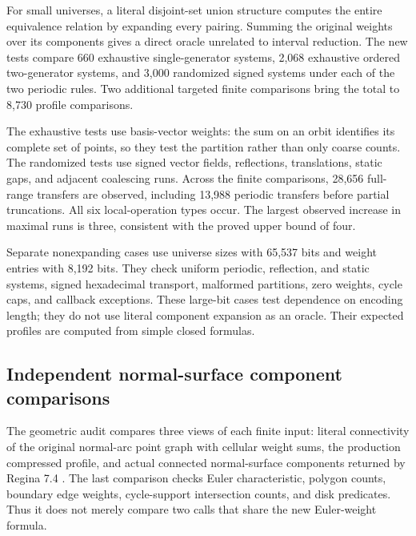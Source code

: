 For small universes, a literal disjoint-set union structure computes the
entire equivalence relation by expanding every pairing.  Summing the original
weights over its components gives a direct oracle unrelated to interval
reduction.  The new tests compare 660 exhaustive single-generator systems,
2,068 exhaustive ordered two-generator systems, and 3,000 randomized signed
systems under each of the two periodic rules.  Two additional targeted
finite comparisons bring the total to 8,730 profile comparisons.

The exhaustive tests use basis-vector weights: the sum on an orbit identifies
its complete set of points, so they test the partition rather than only
coarse counts.  The randomized tests use signed vector fields, reflections,
translations, static gaps, and adjacent coalescing runs.  Across the finite
comparisons, 28,656 full-range transfers are observed, including 13,988
periodic transfers before partial truncations.  All six local-operation
types occur.  The largest observed increase in maximal runs is three,
consistent with the proved upper bound of four.

Separate nonexpanding cases use universe sizes with 65,537 bits and weight
entries with 8,192 bits.  They check uniform periodic, reflection, and static
systems, signed hexadecimal transport, malformed partitions, zero weights,
cycle caps, and callback exceptions.  These large-bit cases test dependence
on encoding length; they do not use literal component expansion as an oracle.
Their expected profiles are computed from simple closed formulas.

\subsection{Independent normal-surface component comparisons}

The geometric audit compares three views of each finite input: literal
connectivity of the original normal-arc point graph with cellular weight
sums, the production compressed profile, and actual connected normal-surface
components returned by Regina 7.4 \cite{Regina}.  The last comparison checks
Euler characteristic, polygon counts, boundary edge weights, cycle-support
intersection counts, and disk predicates.  Thus it does not merely compare
two calls that share the new Euler-weight formula.

